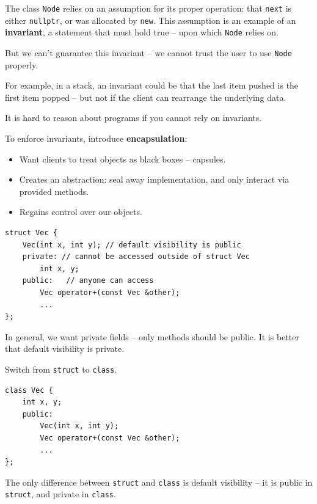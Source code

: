 \documentclass[11pt]{article}
\theoremstyle{definition}
\begin{document}
The class {\tt Node} relies on an assumption for its proper operation: that {\tt next} is either {\tt nullptr}, or was allocated by {\tt new}.
This assumption is an example of an {\bf invariant}, a statement that must hold true -- upon which {\tt Node} relies on.

But we can't guarantee this invariant -- we cannot trust the user to use {\tt Node} properly.

For example, in a stack, an invariant could be that the last item pushed is the first item popped -- but not if the client can rearrange the underlying data.

It is hard to reason about programs if you cannot rely on invariants.

To enforce invariants, introduce {\bf encapsulation}:\vspace{-0.25cm}
\begin{itemize}
    \item Want clients to treat objects as black boxes -- capsules.
    \item Creates an abstraction: seal away implementation, and only interact via provided methods.
    \item Regains control over our objects.
\end{itemize}
\vspace{-0.25cm}
\begin{lstlisting}
struct Vec {
    Vec(int x, int y); // default visibility is public
    private: // cannot be accessed outside of struct Vec
        int x, y;
    public:   // anyone can access
        Vec operator+(const Vec &other);
        ...
};
\end{lstlisting}
In general, we want private fields -- only methods should be public. It is better that default visibility is private.

Switch from {\tt struct} to {\tt class}.
\begin{lstlisting}
class Vec {
    int x, y;
    public:
        Vec(int x, int y);
        Vec operator+(const Vec &other);
        ...
};
\end{lstlisting}
The only difference between {\tt struct} and {\tt class} is default visibility -- it is public in {\tt struct}, and private in {\tt class}.
\end{document}
